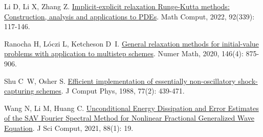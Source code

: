 \begin{thebibliography}{77}
    Li D, Li X, Zhang Z.
    \newblock \href{https://www.ams.org/mcom/2023-92-339/S0025-5718-2022-03766-2/}{Implicit-explicit relaxation {{Runge-Kutta}} methods: Construction, analysis and applications to {{PDEs}}}\allowbreak[J].
    \newblock Math Comput, 2022, 92\allowbreak (339): 117-146.
    
    Ranocha H, L{\'o}czi L, Ketcheson D~I.
    \newblock \href{https://doi.org/10.1007/s00211-020-01158-4}{General relaxation methods for initial-value problems with application to multistep schemes}\allowbreak[J].
    \newblock Numer Math, 2020, 146\allowbreak (4): 875-906.
    
    Shu C~W, Osher S.
    \newblock \href{https://www.sciencedirect.com/science/article/pii/0021999188901775}{Efficient implementation of essentially non-oscillatory shock-capturing schemes}\allowbreak[J].
    \newblock J Comput Phys, 1988, 77\allowbreak (2): 439-471.
    
    Wang N, Li M, Huang C.
    \newblock \href{https://link.springer.com/10.1007/s10915-021-01534-8}{Unconditional {{Energy Dissipation}} and {{Error Estimates}} of the {{SAV Fourier Spectral Method}} for {{Nonlinear Fractional Generalized Wave Equation}}}\allowbreak[J].
    \newblock J Sci Comput, 2021, 88\allowbreak (1): 19.
    
    \end{thebibliography}
    